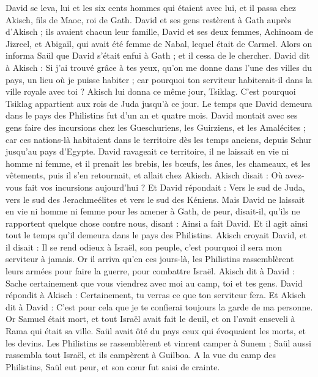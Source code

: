\begin{multicols}{2}
David se leva, lui et les six cents hommes qui étaient avec lui, et il passa chez Akisch, fils de Maoc, roi de Gath.
David et ses gens restèrent à Gath auprès d'Akisch ; ils avaient chacun leur famille, David et ses deux femmes, Achinoam de Jizreel, et Abigaïl, qui avait été femme de Nabal, lequel était de Carmel.
Alors on informa Saül que David s'était enfui à Gath ; et il cessa de le chercher.
David dit à Akisch : Si j'ai trouvé grâce à tes yeux, qu'on me donne dans l'une des villes du pays, un lieu où je puisse habiter ; car pourquoi ton serviteur habiterait-il dans la ville royale avec toi ?
Akisch lui donna ce même jour, Tsiklag. C'est pourquoi Tsiklag appartient aux rois de Juda jusqu'à ce jour.
Le temps que David demeura dans le pays des Philistins fut d'un an et quatre mois.
David montait avec ses gens faire des incursions chez les Gueschuriens, les Guirziens, et les Amalécites ; car ces nations-là habitaient dans le territoire dès les temps anciens, depuis Schur jusqu'au pays d'Egypte.
David ravageait ce territoire, il ne laissait en vie ni homme ni femme, et il prenait les brebis, les bœufs, les ânes, les chameaux, et les vêtements, puis il s'en retournait, et allait chez Akisch.
Akisch disait : Où avez-vous fait vos incursions aujourd'hui ? Et David répondait : Vers le sud de Juda, vers le sud des Jerachmeélites et vers le sud des Kéniens.
Mais David ne laissait en vie ni homme ni femme pour les amener à Gath, de peur, disait-il, qu'ils ne rapportent quelque chose contre nous, disant : Ainsi a fait David. Et il agit ainsi tout le temps qu'il demeura dans le pays des Philistins.
Akisch croyait David, et il disait : Il se rend odieux à Israël, son peuple, c'est pourquoi il sera mon serviteur à jamais.
\VerseOne{}Or il arriva qu'en ces jours-là, les Philistins rassemblèrent leurs armées pour faire la guerre, pour combattre Israël. Akisch dit à David : Sache certainement que vous viendrez avec moi au camp, toi et tes gens.
David répondit à Akisch : Certainement, tu verras ce que ton serviteur fera. Et Akisch dit à David : C'est pour cela que je te confierai toujours la garde de ma personne.
Or Samuel était mort, et tout Israël avait fait le deuil, et on l'avait enseveli à Rama qui était sa ville. Saül avait ôté du pays ceux qui évoquaient les morts, et les devins.
Les Philistins se rassemblèrent et vinrent camper à Sunem ; Saül aussi rassembla tout Israël, et ils campèrent à Guilboa.
A la vue du camp des Philistins, Saül eut peur, et son cœur fut saisi de crainte.

\end{multicols}
